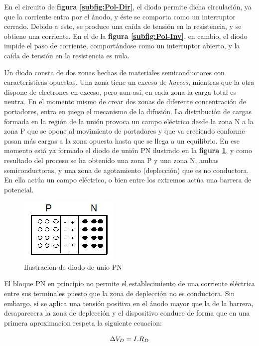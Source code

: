 \documentclass[11pt,a4paper]{article}
\begin{document}
En el circuito de \textbf{figura \ref{subfig:Pol-Dir}}, el diodo permite dicha circulación, ya que la corriente entra por el ánodo, y éste se comporta como un interruptor cerrado. Debido a esto, se produce una caída de tensión en la resistencia, y se obtiene una corriente. En el de la \textbf{figura \ref{subfig:Pol-Inv}}, en cambio, el diodo impide el paso de corriente, comportándose como un interruptor abierto, y la caída de tensión en la resistencia es nula.

Un diodo consta de dos zonas hechas de materiales semiconductores con caracteristicas opuestas. Una zona tiene un exceso de \textit{huecos}, mientras que la otra dispone de electrones en exceso, pero aun asi, en cada zona la carga total es neutra. En el momento mismo de crear dos zonas de diferente concentración de portadores, entra en juego el mecanismo de la difusión. La distribución de cargas formada en la región de la unión provoca un campo eléctrico desde la zona N a la zona P que se opone al movimiento de portadores y que va creciendo conforme pasan más cargas a la zona opuesta hasta que se llega a un equilibrio. En ese momento está ya formado el diodo de unión PN ilustrado en la \textbf{figura \ref{fig:Dif}}, y como resultado del proceso se ha obtenido una zona P y una zona N, ambas semiconductoras, y una zona de agotamiento (deplección) que es no conductora. En ella actúa un campo eléctrico, o bien entre los extremos actúa una barrera de potencial.

\begin{figure}[H]
\centering
\includegraphics[scale=0.8]{Difusion}
   \caption{Ilustracion de diodo de unio PN}
   \label{fig:Dif}
\end{figure}

El bloque PN  en principio no permite el establecimiento de una corriente eléctrica entre sus terminales puesto que la zona de deplección no es conductora. Sin embargo, si se aplica una tensión positiva en el ánodo mayor que la de la barrera, desaparecera la zona de deplección y el dispositivo conduce de forma que en una primera aproximacion respeta la siguiente ecuacion:

\begin{equation}{\label{Aprox}}
\Delta  V_D = I.R_D\\
\end{equation}
\end{document}
